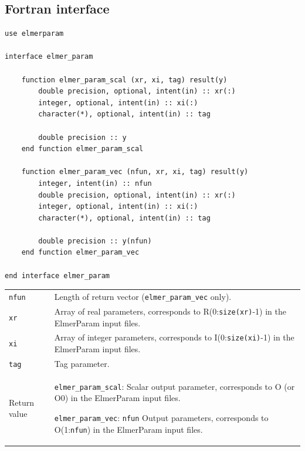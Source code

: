 \documentclass[12pt,a4paper]{article}
\newcommand{\code}[1]{\texttt{#1}}
\begin{document}
\subsection{Fortran interface}

\begin{verbatim}
use elmerparam

interface elmer_param

    function elmer_param_scal (xr, xi, tag) result(y)
        double precision, optional, intent(in) :: xr(:)
        integer, optional, intent(in) :: xi(:)
        character(*), optional, intent(in) :: tag

        double precision :: y
    end function elmer_param_scal

    function elmer_param_vec (nfun, xr, xi, tag) result(y)
        integer, intent(in) :: nfun
        double precision, optional, intent(in) :: xr(:)
        integer, optional, intent(in) :: xi(:)
        character(*), optional, intent(in) :: tag

        double precision :: y(nfun)
    end function elmer_param_vec

end interface elmer_param
\end{verbatim}
\begin{table}[H]
\begin{tabular}{ll}
    \code{nfun} &Length of return vector (\code{elmer\_param\_vec} only).\\

    \code{xr} &\parbox[t]{10cm}{Array of real parameters, corresponds to
    R(0:\code{size(xr)}-1) in the ElmerParam input files.}\\

    \code{xi} &\parbox[t]{10cm}{Array of integer parameters, corresponds to
    I(0:\code{size(xi)}-1) in the ElmerParam input files.}\\

    \code{tag} &Tag parameter.\\

    Return value &\parbox[t]{10cm}{
    \code{elmer\_param\_scal}: Scalar output parameter, corresponds to O (or O0)
    in the ElmerParam input files.
    
    \vspace{1ex}

    \code{elmer\_param\_vec}: \code{nfun} Output parameters, corresponds to
    O(1:\code{nfun}) in the ElmerParam input files.}\\

\end{tabular}
\end{table}
\end{document}
